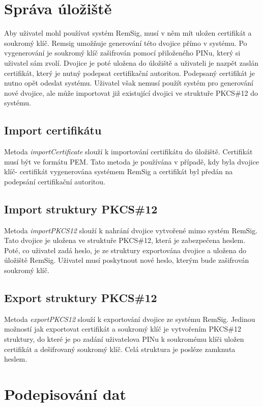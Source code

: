 \documentclass[]{fithesis3}
\begin{document}
	\section{Správa úložiště}
	
	Aby uživatel mohl používat systém RemSig, musí v něm mít uložen certifikát a soukromý klíč. 		Remsig umožňuje generování této dvojice přímo v systému. Po vygenerování je soukromý klíč 		zašifrován pomocí přiloženého PINu, který si uživatel sám zvolí. Dvojice je poté uložena do 			úložiště a uživateli je nazpět zaslán certifikát, který je nutný podepsat certifikační autoritou. 		Podepsaný certifikát je nutno opět odeslat systému. Uživatel však nemusí použít systém pro 		generování nové dvojice, ale může importovat již existující dvojici ve struktuře PKCS\#12 do 		systému.

		\subsection{Import certifikátu}
		Metoda \textit{importCertificate} slouží k importování certifikátu do úložiště. Certifikát 			musí být ve formátu PEM. Tato metoda je používána v případě, kdy byla dvojice klíč-				certifikát vygenerována systémem RemSig a certifikát byl předán na podepsání 					certifikační autoritou.

		\subsection{Import struktury PKCS\#12}
		Metoda \textit{importPKCS12} slouží k nahrání dvojice vytvořené mimo systém RemSig. 			Tato dvojice je uložena ve struktuře PKCS\#12, která je zabezpečena heslem. Poté, co 			uživatel zadá heslo, je ze struktury exportována dvojice a uložena do úložiště RemSig. 				Uživatel musí poskytnout nové heslo, kterým bude zašifrován soukromý klíč.

		\subsection{Export struktury PKCS\#12}
		Metoda \textit{exportPKCS12} slouží k exportování dvojice ze systému RemSig. Jedinou 			možností jak exportovat certifikát a soukromý klíč je vytvořením PKCS\#12 struktury, do 		které je po zadání uživatelova PINu k soukromému klíči uložen certifikát a dešifrovaný 				soukromý klíč. Celá struktura je posléze zamknuta heslem.

	\section{Podepisování dat}
\end{document}
